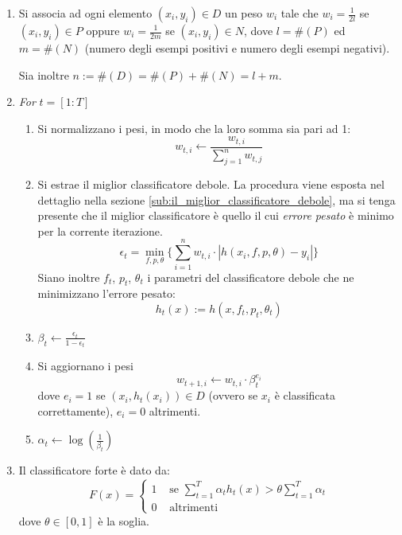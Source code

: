 \documentclass[a4paper,11pt,oneside]{article}
\begin{document}
			\begin{enumerate}
				\item Si associa ad ogni elemento $(x_i, y_i) \in D$ un peso $w_i$ tale che $w_i = \frac{1}{2l}$ se $(x_i, y_i) \in P$ oppure $w_i = \frac{1}{2m}$ se $(x_i, y_i) \in N$, dove $l = \#(P)$ ed $m = \#(N)$ (numero degli esempi positivi e numero degli esempi negativi).

				Sia inoltre $n := \#(D) = \#(P) + \#(N) = l + m$.

				\item \emph{For} $t = [1:T]$
					\begin{enumerate}
						\item Si normalizzano i pesi, in modo che la loro somma sia pari ad 1:
						$$ w_{t,i} \leftarrow \frac{w_{t,i}}{\sum_{j = 1}^{n}w_{t,j}}$$

						\item \label{adaboost_minimum_error}
						Si estrae il miglior classificatore debole. La procedura viene esposta nel dettaglio nella sezione \ref{sub:il_miglior_classificatore_debole}, ma si tenga presente che il miglior classificatore è quello il cui \emph{errore pesato} è minimo per la corrente iterazione.
						$$ \epsilon_t = \min_{f,p,\theta} \{
							\sum_{i = 1}^{n} w_{t,i} \cdot |h(x_i, f, p, \theta) - y_i|
						\} $$
						Siano inoltre $f_t$, $p_t$, $\theta_t$ i parametri del classificatore debole che ne minimizzano l'errore pesato:
						$$ h_t(x) := h(x, f_t, p_t, \theta_t) $$

						\item \label{adaboost_beta} $\beta_t \leftarrow \frac{\epsilon_t}{1 - \epsilon_t}$

						\item \label{adaboost_update_weights} Si aggiornano i pesi
						$$ w_{t+1, i} \leftarrow w_{t,i} \cdot \beta_{t}^{e_i} $$
						dove $e_i = 1$ se $(x_i, h_t(x_i)) \in D$ (ovvero se $x_i$ è classificata correttamente), $e_i = 0$ altrimenti.

						\item $\alpha_t \leftarrow \log(\frac{1}{\beta_t})$
					\end{enumerate}

				\item \label{adaboost_strong_classifier} Il classificatore forte è dato da:
				\begin{equation}
					F(x) = \begin{cases}
						1 & \text{ se } \sum_{t = 1}^{T} \alpha_t h_t(x) > \theta \sum_{t = 1}^{T} \alpha_t \\
						0 & \text{ altrimenti }
					\end{cases}
				\end{equation}
				dove $\theta \in [0,1]$ è la soglia.
			\end{enumerate}
\end{document}
